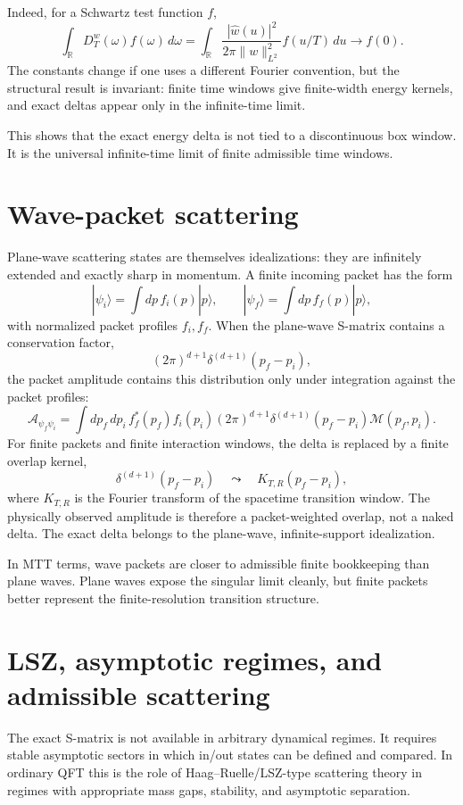 \documentclass[11pt]{article}
\begin{document}
Indeed, for a Schwartz test function \(f\),
\[
\int_{\mathbb R}D_T^w(\omega)f(\omega)\,d\omega
=
\int_{\mathbb R}
\frac{|\widehat w(u)|^2}{2\pi\|w\|_{L^2}^2}
f(u/T)\,du
\to f(0).
\]
The constants change if one uses a different Fourier convention, but the structural result is invariant: finite time windows give finite-width energy kernels, and exact deltas appear only in the infinite-time limit.

This shows that the exact energy delta is not tied to a discontinuous box window.  It is the universal infinite-time limit of finite admissible time windows.

\section{Wave-packet scattering}

Plane-wave scattering states are themselves idealizations: they are infinitely extended and exactly sharp in momentum.  A finite incoming packet has the form
\[
|\psi_i\rangle=\int dp\, f_i(p)|p\rangle,
\qquad
|\psi_f\rangle=\int dp\, f_f(p)|p\rangle,
\]
with normalized packet profiles \(f_i,f_f\).  When the plane-wave S-matrix contains a conservation factor,
\[
(2\pi)^{d+1}\delta^{(d+1)}(p_f-p_i),
\]
the packet amplitude contains this distribution only under integration against the packet profiles:
\[
\mathcal A_{\psi_f\psi_i}
=
\int dp_f\,dp_i\,
f_f^\ast(p_f)f_i(p_i)
(2\pi)^{d+1}\delta^{(d+1)}(p_f-p_i)\mathcal M(p_f,p_i).
\]
For finite packets and finite interaction windows, the delta is replaced by a finite overlap kernel,
\[
\delta^{(d+1)}(p_f-p_i)
\quad\leadsto\quad
K_{T,R}(p_f-p_i),
\]
where \(K_{T,R}\) is the Fourier transform of the spacetime transition window.  The physically observed amplitude is therefore a packet-weighted overlap, not a naked delta.  The exact delta belongs to the plane-wave, infinite-support idealization.

In MTT terms, wave packets are closer to admissible finite bookkeeping than plane waves.  Plane waves expose the singular limit cleanly, but finite packets better represent the finite-resolution transition structure.

\section{LSZ, asymptotic regimes, and admissible scattering}

The exact S-matrix is not available in arbitrary dynamical regimes.  It requires stable asymptotic sectors in which in/out states can be defined and compared.  In ordinary QFT this is the role of Haag--Ruelle/LSZ-type scattering theory in regimes with appropriate mass gaps, stability, and asymptotic separation.
\end{document}
